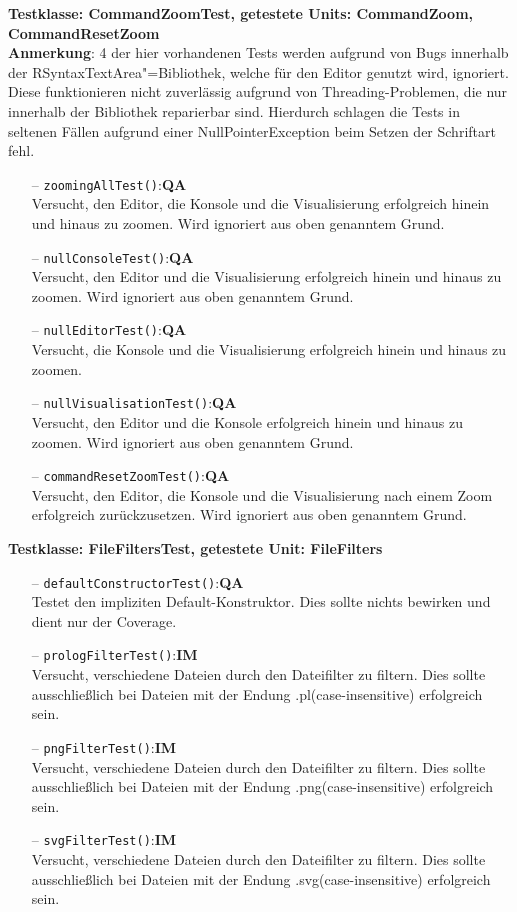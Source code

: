 \documentclass[parskip=full,11pt,twoside]{scrartcl}
\def\qa{\hfill\textbf{QA}}
\def\impl{\hfill\textbf{IM}}
\begin{document}
\textbf{Testklasse: CommandZoomTest, getestete Units: CommandZoom, CommandResetZoom}\\
\textbf{Anmerkung}: 4 der hier vorhandenen Tests werden aufgrund von Bugs innerhalb der RSyntaxTextArea"=Bibliothek, welche für den Editor genutzt wird, ignoriert. Diese funktionieren nicht zuverlässig aufgrund von Threading-Problemen, die nur innerhalb der Bibliothek reparierbar sind. Hierdurch schlagen die Tests in seltenen Fällen aufgrund einer NullPointerException beim Setzen der Schriftart fehl.
\begin{itemize}
	\item[--] \texttt{zoomingAllTest()}:\qa\\
	Versucht, den Editor, die Konsole und die Visualisierung erfolgreich hinein und hinaus zu zoomen. Wird ignoriert aus oben genanntem Grund.
	\item[--] \texttt{nullConsoleTest()}:\qa\\
	Versucht, den Editor und die Visualisierung erfolgreich hinein und hinaus zu zoomen. Wird ignoriert aus oben genanntem Grund.
	\item[--] \texttt{nullEditorTest()}:\qa\\
	Versucht, die Konsole und die Visualisierung erfolgreich hinein und hinaus zu zoomen.
	\item[--] \texttt{nullVisualisationTest()}:\qa\\
	Versucht, den Editor und die Konsole erfolgreich hinein und hinaus zu zoomen. Wird ignoriert aus oben genanntem Grund.
	\item[--] \texttt{commandResetZoomTest()}:\qa\\
	Versucht, den Editor, die Konsole und die Visualisierung nach einem Zoom erfolgreich zurückzusetzen. Wird ignoriert aus oben genanntem Grund.
\end{itemize}

\textbf{Testklasse: FileFiltersTest, getestete Unit: FileFilters}
\begin{itemize}
	\item[--] \texttt{defaultConstructorTest()}:\qa\\
	Testet den impliziten Default-Konstruktor. Dies sollte nichts bewirken und dient nur der Coverage.
	\item[--] \texttt{prologFilterTest()}:\impl\\
	Versucht, verschiedene Dateien durch den Dateifilter zu filtern. Dies sollte ausschließlich bei Dateien mit der Endung \glqq .pl\grqq (case-insensitive) erfolgreich sein.
	\item[--] \texttt{pngFilterTest()}:\impl\\
	Versucht, verschiedene Dateien durch den Dateifilter zu filtern. Dies sollte ausschließlich bei Dateien mit der Endung \glqq .png\grqq (case-insensitive) erfolgreich sein.
	\item[--] \texttt{svgFilterTest()}:\impl\\
	Versucht, verschiedene Dateien durch den Dateifilter zu filtern. Dies sollte ausschließlich bei Dateien mit der Endung \glqq .svg\grqq (case-insensitive) erfolgreich sein.
\end{itemize}
\end{document}
